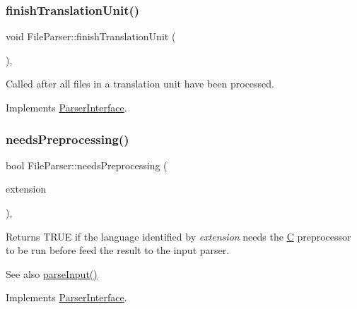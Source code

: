 \subsubsection{\texorpdfstring{finishTranslationUnit()}{finishTranslationUnit()}}
{\footnotesize\ttfamily void File\+Parser\+::finish\+Translation\+Unit (\begin{DoxyParamCaption}{ }\end{DoxyParamCaption})\hspace{0.3cm}{\ttfamily [inline]}, {\ttfamily [virtual]}}

Called after all files in a translation unit have been processed. 

Implements \mbox{\hyperlink{class_parser_interface_af3acd64c6a33852e2e46e7288eb9c9cf}{Parser\+Interface}}.

\mbox{\label{class_file_parser_acf9bb5f92915a547a6638a07e63b9100}} 
\subsubsection{\texorpdfstring{needsPreprocessing()}{needsPreprocessing()}}
{\footnotesize\ttfamily bool File\+Parser\+::needs\+Preprocessing (\begin{DoxyParamCaption}\item[{const \mbox{\hyperlink{class_q_c_string}{Q\+C\+String}} \&}]{extension }\end{DoxyParamCaption})\hspace{0.3cm}{\ttfamily [inline]}, {\ttfamily [virtual]}}

Returns T\+R\+UE if the language identified by {\itshape extension} needs the \mbox{\hyperlink{class_c}{C}} preprocessor to be run before feed the result to the input parser. \begin{DoxySeeAlso}{See also}
\mbox{\hyperlink{class_file_parser_a129994a05caded4f7bfe5d30945f008b}{parse\+Input()}} 
\end{DoxySeeAlso}


Implements \mbox{\hyperlink{class_parser_interface_a36c669b17b64a6e3847f27d70a5398d2}{Parser\+Interface}}.

\mbox{\label{class_file_parser_aa9db12f7a11ecbd929a1998fc4ef3b3c}} 
